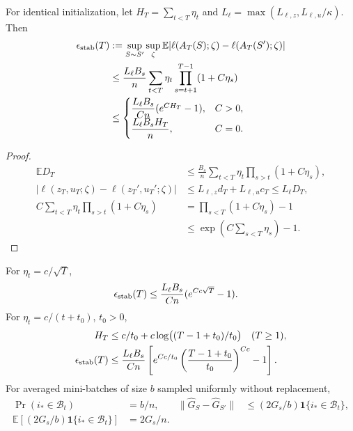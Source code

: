 \begin{theorem}
\label{thm:rigid-stability}
For identical initialization, let $H_T=\sum_{t<T}\eta_t$ and
$L_\ell=\max(L_{\ell,z},L_{\ell,u}/\kappa)$. Then
\begin{align}\label{eq:rigid-stability-bound}
 \epsilon_{\rm stab}(T)
 &:=\sup_{S\sim S'}\sup_\zeta
 \mathbb E|\ell(A_T(S);\zeta)-\ell(A_T(S');\zeta)|\\
 &\le\frac{L_\ell B_s}{n}\sum_{t<T}\eta_t\prod_{s=t+1}^{T-1}(1+C\eta_s)\\
 &\le\begin{cases}
 \dfrac{L_\ell B_s}{Cn}(e^{CH_T}-1),&C>0,\\[3pt]
 \dfrac{L_\ell B_sH_T}{n},&C=0.
 \end{cases}
\end{align}
\end{theorem}
\begin{proof}
\begin{align}
 \mathbb ED_T
 &\le\frac{B_s}{n}\sum_{t<T}\eta_t\prod_{s>t}(1+C\eta_s),\\
 |\ell(z_T,u_T;\zeta)-\ell(z_T',u_T';\zeta)|
 &\le L_{\ell,z}d_T+L_{\ell,u}c_T\le L_\ell D_T,\\
 C\sum_{t<T}\eta_t\prod_{s>t}(1+C\eta_s)
 &=\prod_{s<T}(1+C\eta_s)-1\\
 &\le\exp\left(C\sum_{s<T}\eta_s\right)-1.
\end{align}
\end{proof}

\begin{corollary}
For $\eta_t=c/\sqrt T$,
\begin{align}
 \epsilon_{\rm stab}(T)&\le\frac{L_\ell B_s}{Cn}(e^{Cc\sqrt T}-1).
\end{align}
For $\eta_t=c/(t+t_0)$, $t_0>0$,
\begin{align}
 H_T&\le c/t_0+c\log\bigl((T-1+t_0)/t_0\bigr)\quad(T\ge1),\\
 \epsilon_{\rm stab}(T)
 &\le\frac{L_\ell B_s}{Cn}
 \left[e^{Cc/t_0}\left(\frac{T-1+t_0}{t_0}\right)^{Cc}-1\right].
\end{align}
For averaged mini-batches of size $b$ sampled uniformly without replacement,
\begin{align}
 \Pr(i_*\in\mathcal B_t)&=b/n,&
 \|\widehat G_S-\widehat G_{S'}\|&\le(2G_s/b)\mathbf1\{i_*\in\mathcal B_t\},\\
 \mathbb E[(2G_s/b)\mathbf1\{i_*\in\mathcal B_t\}]&=2G_s/n.
\end{align}
\end{corollary}

